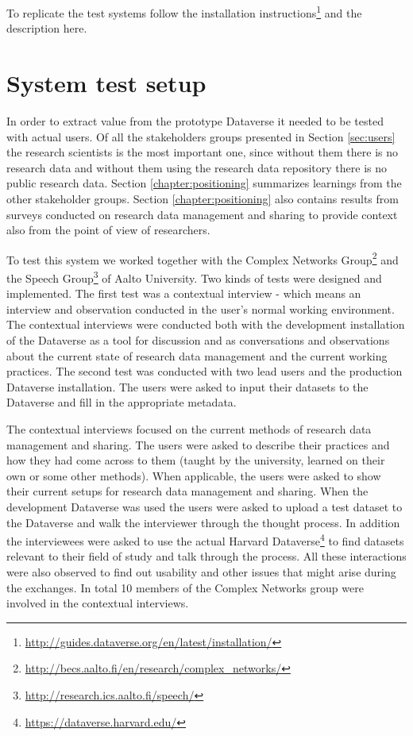 To replicate the test systems follow the installation
instructions\footnote{\url{http://guides.dataverse.org/en/latest/installation/}}
and the description here.

\section{System test setup}
\label{sec:system_testing}

In order to extract value from the prototype Dataverse it needed to be tested
with actual users. Of all the stakeholders groups presented in Section \ref{sec:users}
the research scientists is the most important one, since without them there is
no research data and without them using the research data repository there is
no public research data. Section \ref{chapter:positioning} summarizes learnings
from the other stakeholder groups. Section \ref{chapter:positioning} also contains results from
surveys conducted on research data management and sharing to provide context
also from the point of view of researchers.

To test this system we worked together with the Complex Networks
Group\footnote{\url{http://becs.aalto.fi/en/research/complex\_networks/}} and the
Speech Group\footnote{\url{http://research.ics.aalto.fi/speech/}} of Aalto
University. Two kinds of tests were designed and implemented. The first test was a contextual
interview - which means an interview and observation conducted in the user's normal working
environment. The contextual interviews were conducted both with
the development installation of the Dataverse as a tool for discussion and as
conversations and observations about the current state of research data management and the
current working practices. The second test was conducted with two lead users
and the production Dataverse installation. The users were asked to input their
datasets to the Dataverse and fill in the appropriate metadata.

The contextual interviews focused on the current methods of research data
management and sharing. The users were asked to describe their practices and
how they had come across to them (taught by the university, learned on their
own or some other methods). When applicable, the users were asked to show
their current setups for research data management and sharing. When the
development Dataverse was used the users were asked to upload a test dataset
to the Dataverse and walk the interviewer through the thought process. In
addition the interviewees were asked to use the actual Harvard
Dataverse\footnote{\url{https://dataverse.harvard.edu/}} to find datasets
relevant to their field of study and talk through the process. All these
interactions were also observed to find out usability and other issues that
might arise during the exchanges. In total 10 members of the Complex
Networks group were involved in the contextual interviews.

